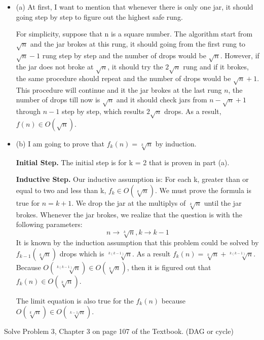 \documentclass[11pt]{article}
\newenvironment{solution}[2][Solution]{\begin{trivlist}
\item[\hskip \labelsep {\bfseries #1}]}{\end{trivlist}}
\newenvironment{problem}[2][Problem]{\begin{trivlist}
\item[\hskip \labelsep {\bfseries #1}\hskip \labelsep {\bfseries #2.}]}{\end{trivlist}}
\begin{document}
\begin{solution}{}
\begin{itemize}
\item (a) At first, I want to mention that whenever there is only one jar, it should going
step by step to figure out the highest safe rung.

For simplicity, suppose that n is a square number.
The algorithm start from $\sqrt{n}$ and the jar brokes at this rung, it should going from the first
rung to $\sqrt{n} - 1$ rung step by step and the number of drops would be $\sqrt{n}$.
However, if the jar does not broke at $\sqrt{n}$, it should try the $2\sqrt{n}$ rung and if it brokes,
the same procedure should repeat and the number of drops would be $\sqrt{n}+1$. This procedure
will continue and it the jar brokes at the last rung $n$, the number of drops till now is $\sqrt{n}$
and it should check jars from $n-\sqrt{n}+1$ through $n-1$ step by step, which results $2\sqrt{n}$
drops. As a result, $f(n) \in O(\sqrt{n})$.

\item (b) I am going to prove that $f_k(n) = \sqrt[k]{n}$ by induction.

\textbf{Initial Step.} The initial step is for k = 2 that is proven in part (a).

\textbf{Inductive Step.} Our inductive assumption is: For each k, greater than or equal to two and
less than k, $f_k \in O(\sqrt[k]{n})$. We must prove the formula is true for $n=k+1$.
We drop the jar at the multiplys of $\sqrt[k]{n}$ until the jar brokes. Whenever the jar brokes,
we realize that the question is with the following parameters: 
$$n \rightarrow \sqrt[k]{n}, k \rightarrow k-1$$
It is known by the induction assumption that this problem could be solved by $f_{k-1}(\sqrt[k]{n})$ drops
which is $\sqrt[k(k-1)]{n}$. As a result $f_k(n) = \sqrt[k]{n} + \sqrt[k(k-1)]{n}$.
Because $O(\sqrt[k(k-1)]{n}) \in O(\sqrt[k]{n})$, then it is figured out that $f_k(n) \in O(\sqrt[k]{n})$.

The limit equation is also true for the $f_k(n)$ because $O(\sqrt[k]{n}) \in O(\sqrt[k-1]{n})$.
\end{itemize}
\end{solution}


\begin{problem}{3}
Solve Problem 3, Chapter 3 on page 107 of the Textbook. (DAG or cycle)
\end{problem}
\end{document}
